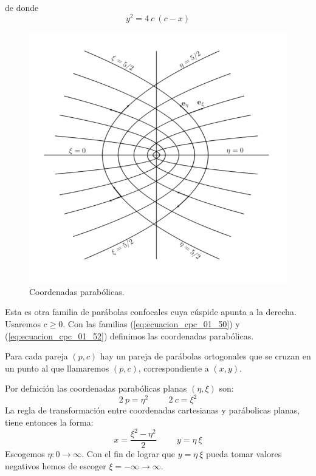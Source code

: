 de donde
\begin{equation}
y^{2} = 4 \: c \: (c -x)
\label{eq:ecuacion_cpc_01_52}
\end{equation}
\begin{figure}[H]
    \centering
    \includegraphics[scale=0.5]{Coordenadas_parabolicas.png}
    \caption{Coordenadas parabólicas.}
\end{figure}
Esta es otra familia de parábolas confocales cuya cúspide apunta a la derecha. Usaremos $c \geq 0$. Con las familias (\ref{eq:ecuacion_cpc_01_50}) y (\ref{eq:ecuacion_cpc_01_52}) definimos las coordenadas parabólicas.
\par
Para cada pareja $(p, c)$ hay un pareja de parábolas ortogonales que se cruzan en un punto al que llamaremos $(p, c)$, correspondiente a $(x, y)$.
\par
Por defnición las coordenadas parabólicas planas $(\eta, \xi)$ son:
\[ 2 \: p = \eta^{2} \hspace{1cm} 2 \: c = \xi^{2} \]
La regla de transformación entre coordenadas cartesianas y parábolicas planas, tiene entonces la forma:
\[ x = \dfrac{\xi^{2} - \eta^{2}}{2} \hspace{1cm} y = \eta \: \xi \]
Escogemos $\eta:0 \to \infty$. Con el fin de lograr que $y = \eta \: \xi$ pueda tomar valores negativos hemos de escoger $\xi = -\infty \to \infty$.
\par
